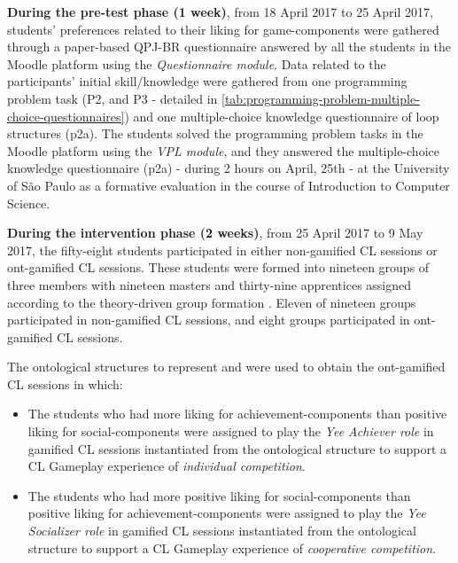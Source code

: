 \textbf{During the pre-test phase (1 week)}, from 18 April 2017 to 25 April 2017, students' preferences related to their liking for game-components were gathered through a paper-based QPJ-BR questionnaire answered by all the students in the Moodle platform using the \emph{Questionnaire module}.
Data related to the participants' initial skill/knowledge were gathered from one programming problem task (P2, and P3 - detailed in \autoref{tab:programming-problem-multiple-choice-questionnaires}) and one multiple-choice knowledge questionnaire of loop structures (p2a).
The students solved the programming problem tasks in the Moodle platform using the \emph{VPL module}, and they answered the multiple-choice knowledge questionnaire (p2a) - during 2 hours on April, 25th - at the University of São Paulo as a formative evaluation in the course of Introduction to Computer Science. 

\textbf{During the intervention phase (2 weeks)}, from 25 April 2017 to 9 May 2017, the fifty-eight students participated in either non-gamified CL sessions or ont-gamified CL sessions.
These students were formed into nineteen groups of three members with nineteen masters and thirty-nine apprentices assigned according to the theory-driven group formation \cite{IsotaniMizoguchi2008a}.
Eleven of nineteen groups participated in non-gamified CL sessions, and eight groups participated in ont-gamified CL sessions.

The ontological structures to represent  and  were used to obtain the ont-gamified CL sessions in which:

\begin{itemize}
\item The students who had more liking for achievement-components than positive liking for social-components were assigned to play the \emph{Yee Achiever role} in gamified CL sessions instantiated from the ontological structure  to support a CL Gameplay experience of \emph{individual competition}.
\item The students who had more positive liking for social-components than positive liking for achievement-components were assigned to play the \emph{Yee Socializer role} in gamified CL sessions instantiated from the ontological structure  to support a CL Gameplay experience of \emph{cooperative competition}.
\end{itemize}

